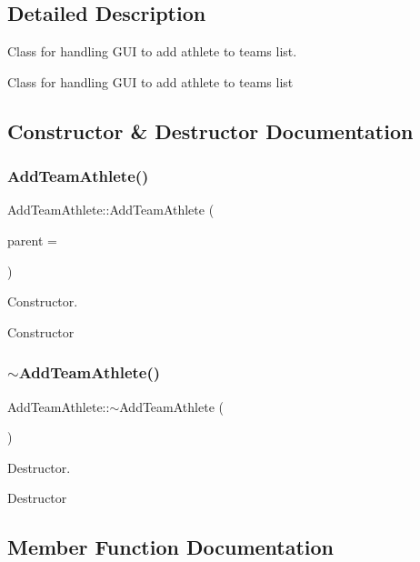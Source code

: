 \subsection{Detailed Description}
Class for handling G\+UI to add athlete to teams list. 

Class for handling G\+UI to add athlete to teams list 

\subsection{Constructor \& Destructor Documentation}
\mbox{\label{classAddTeamAthlete_a55728b5321f8db8631f815cb4a981606}} 
\subsubsection{\texorpdfstring{AddTeamAthlete()}{AddTeamAthlete()}}
{\footnotesize\ttfamily Add\+Team\+Athlete\+::\+Add\+Team\+Athlete (\begin{DoxyParamCaption}\item[{Q\+Widget $\ast$}]{parent = {} }\end{DoxyParamCaption})\hspace{0.3cm}{\ttfamily [explicit]}}



Constructor. 

Constructor \mbox{\label{classAddTeamAthlete_a8722b37d42c8cb95eca6a4de2ffd2a9c}} 
\subsubsection{\texorpdfstring{$\sim$AddTeamAthlete()}{~AddTeamAthlete()}}
{\footnotesize\ttfamily Add\+Team\+Athlete\+::$\sim$\+Add\+Team\+Athlete (\begin{DoxyParamCaption}{ }\end{DoxyParamCaption})}



Destructor. 

Destructor 

\subsection{Member Function Documentation}
\mbox{\label{classAddTeamAthlete_ac073711073bceacbcebe42d202aa019c}} 
